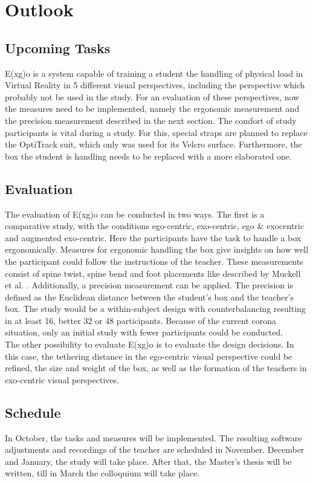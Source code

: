 \chapter{Outlook}

\section{Upcoming Tasks}
E(x\textbar g)o is a system capable of training a student the handling of physical load in Virtual Reality in 5 different visual perspectives, including the perspective which probably not be used in the study. For an evaluation of these perspectives, now the measures need to be implemented, namely the ergonomic measurement and the precision measurement described in the next section. The comfort of study participants is vital during a study. For this, special straps are planned to replace the OptiTrack suit, which only was used for its Velcro surface. Furthermore, the box the student is handling needs to be replaced with a more elaborated one.

\section{Evaluation}
The evaluation of E(x\textbar g)o can be conducted in two ways. The first is a comparative study, with the conditions ego-centric, exo-centric, ego \& exocentric and augmented exo-centric. Here the participants have the task to handle a box ergonomically. Measures for ergonomic handling the box give insights on how well the participant could follow the instructions of the teacher. These measurements consist of spine twist, spine bend and foot placements like described by Muckell et al. \cite{Muckell2017}. Additionally, a precision measurement can be applied. The precision is defined as the Euclidean distance between the student's box and the teacher's box. The study would be a within-subject design with counterbalancing resulting in at least 16, better 32 or 48 participants. Because of the current corona situation, only an initial study with fewer participants could be conducted.\\
The other possibility to evaluate E(x\textbar g)o is to evaluate the design decisions. In this case, the tethering distance in the ego-centric visual perspective could be refined, the size and weight of the box, as well as the formation of the teachers in exo-centric visual perspectives.

\section{Schedule}
In October, the tasks and measures will be implemented. The resulting software adjustments and recordings of the teacher are scheduled in November. December and January, the study will take place. After that, the Master's thesis will be written, till in March the colloquium will take place.